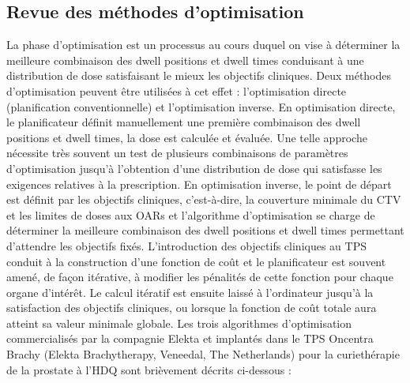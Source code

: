 \subsection{Revue des méthodes d'optimisation}\label{sssec:optimis} 
La phase d’optimisation est un processus au cours duquel on vise à déterminer la meilleure combinaison des dwell positions et dwell times conduisant à une distribution de dose satisfaisant le mieux les objectifs cliniques. Deux méthodes d’optimisation peuvent être utilisées à cet effet : l’optimisation directe (planification conventionnelle) et l’optimisation inverse. En optimisation directe, le planificateur définit manuellement une première combinaison des dwell positions et dwell times, la dose est calculée et évaluée. Une telle approche nécessite très souvent un test de plusieurs combinaisons de paramètres d’optimisation jusqu’à l’obtention d’une distribution de dose qui satisfasse les exigences relatives à la prescription. En optimisation inverse, le point de départ est définit par les objectifs cliniques, c’est-à-dire, la couverture minimale du CTV et les limites de doses aux OARs et l’algorithme d’optimisation se charge de déterminer la meilleure combinaison des dwell positions et dwell times permettant d’attendre les objectifs fixés. L’introduction des objectifs cliniques au TPS conduit à la construction d’une fonction de coût et le planificateur est souvent amené, de façon itérative, à modifier les pénalités de cette fonction pour chaque organe d’intérêt. Le calcul itératif est ensuite laissé à l’ordinateur jusqu’à la satisfaction des objectifs cliniques, ou lorsque la fonction de coût totale aura atteint sa valeur minimale globale. Les trois algorithmes d’optimisation commercialisés par la compagnie Elekta et implantés dans le TPS Oncentra Brachy (Elekta Brachytherapy, Veneedal, The Netherlands) pour la curiethérapie de la prostate à l’HDQ sont brièvement décrits ci-dessous :\newline
%

